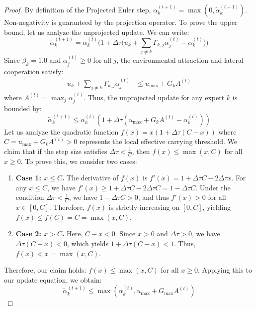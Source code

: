 \begin{proof}
By definition of the Projected Euler step, $\alpha^{(t+1)}_k = \max(0, \tilde{\alpha}^{(t+1)}_k)$. Non-negativity is guaranteed by the projection operator. To prove the upper bound, let us analyze the unprojected update. We can write:
\begin{equation}
    \tilde{\alpha}_{k}^{(t+1)} = \alpha_{k}^{(t)} \Big( 1 + \Delta \tau \Big( u_{k} + \sum_{j \neq k} \Gamma_{k, j} \alpha_{j}^{(t)} - \alpha_{k}^{(t)} \Big) \Big)
\end{equation}
Since $\beta_k = 1.0$ and $\alpha^{(t)}_j \geq 0$ for all $j$, the environmental attraction and lateral cooperation satisfy:
\begin{align}
    u_{k} + \sum_{j \neq k} \Gamma_{k, j} \alpha_{j}^{(t)} &\leq u_{\max} + G_k A^{(t)}
\end{align}
where $A^{(t)} = \max_j \alpha^{(t)}_j$. Thus, the unprojected update for any expert $k$ is bounded by:
\begin{equation}
    \tilde{\alpha}_{k}^{(t+1)} \leq \alpha_{k}^{(t)} \left( 1 + \Delta \tau \left( u_{\max} + G_k A^{(t)} - \alpha_{k}^{(t)} \right) \right)
\end{equation}
Let us analyze the quadratic function $f(x) = x \left( 1 + \Delta \tau \left( C - x \right) \right)$ where $C = u_{\max} + G_k A^{(t)} > 0$ represents the local effective carrying threshold. We claim that if the step size satisfies $\Delta \tau < \frac{1}{C}$, then $f(x) \leq \max(x, C)$ for all $x \geq 0$.
To prove this, we consider two cases:
\begin{enumerate}
    \item \textbf{Case 1: $x \leq C$.} The derivative of $f(x)$ is $f'(x) = 1 + \Delta \tau C - 2 \Delta \tau x$. For any $x \leq C$, we have $f'(x) \geq 1 + \Delta \tau C - 2 \Delta \tau C = 1 - \Delta \tau C$. Under the condition $\Delta \tau < \frac{1}{C}$, we have $1 - \Delta \tau C > 0$, and thus $f'(x) > 0$ for all $x \in [0, C]$. Therefore, $f(x)$ is strictly increasing on $[0, C]$, yielding $f(x) \leq f(C) = C = \max(x, C)$.
    \item \textbf{Case 2: $x > C$.} Here, $C - x < 0$. Since $x > 0$ and $\Delta \tau > 0$, we have $\Delta \tau (C - x) < 0$, which yields $1 + \Delta \tau (C - x) < 1$. Thus, $f(x) < x = \max(x, C)$.
\end{enumerate}
Therefore, our claim holds: $f(x) \leq \max(x, C)$ for all $x \geq 0$. Applying this to our update equation, we obtain:
\begin{equation}
    \tilde{\alpha}_{k}^{(t+1)} \leq \max\left( \alpha_{k}^{(t)}, u_{\max} + G_{\max} A^{(t)} \right)

\end{equation}
\end{proof}
